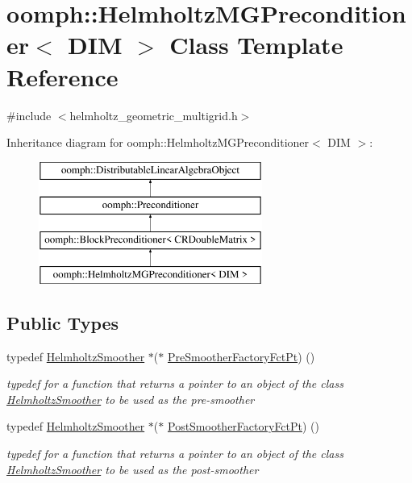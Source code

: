 \hypertarget{classoomph_1_1HelmholtzMGPreconditioner}{}\section{oomph\+:\+:Helmholtz\+M\+G\+Preconditioner$<$ D\+IM $>$ Class Template Reference}
\label{classoomph_1_1HelmholtzMGPreconditioner}


{\ttfamily \#include $<$helmholtz\+\_\+geometric\+\_\+multigrid.\+h$>$}

Inheritance diagram for oomph\+:\+:Helmholtz\+M\+G\+Preconditioner$<$ D\+IM $>$\+:\begin{figure}[H]
\begin{center}
\leavevmode
\includegraphics[height=4.000000cm]{classoomph_1_1HelmholtzMGPreconditioner}
\end{center}
\end{figure}
\subsection*{Public Types}
\begin{DoxyCompactItemize}
\item 
typedef \hyperlink{classoomph_1_1HelmholtzSmoother}{Helmholtz\+Smoother} $\ast$($\ast$ \hyperlink{classoomph_1_1HelmholtzMGPreconditioner_ac17ab35f36cad29ce8f1e64593c90a95}{Pre\+Smoother\+Factory\+Fct\+Pt}) ()
\begin{DoxyCompactList}\small\item\em typedef for a function that returns a pointer to an object of the class \hyperlink{classoomph_1_1HelmholtzSmoother}{Helmholtz\+Smoother} to be used as the pre-\/smoother \end{DoxyCompactList}\item 
typedef \hyperlink{classoomph_1_1HelmholtzSmoother}{Helmholtz\+Smoother} $\ast$($\ast$ \hyperlink{classoomph_1_1HelmholtzMGPreconditioner_a3405bc1f75c5e1e83601cd9b0e02634b}{Post\+Smoother\+Factory\+Fct\+Pt}) ()
\begin{DoxyCompactList}\small\item\em typedef for a function that returns a pointer to an object of the class \hyperlink{classoomph_1_1HelmholtzSmoother}{Helmholtz\+Smoother} to be used as the post-\/smoother \end{DoxyCompactList}\end{DoxyCompactItemize}
